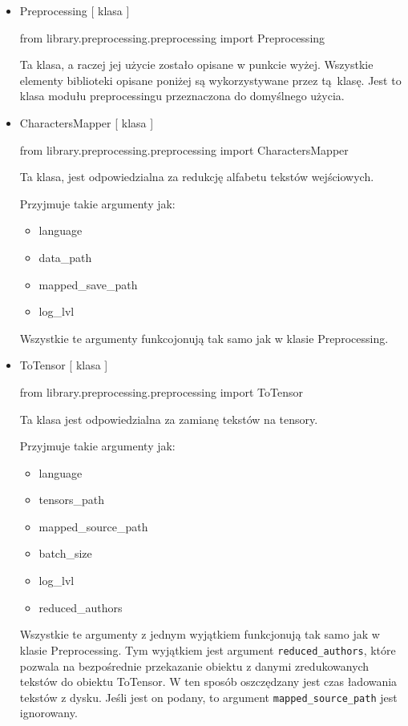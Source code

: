 \begin{itemize}
	
\item  {Preprocessing [ klasa ] }
\begin{import}
from library.preprocessing.preprocessing import Preprocessing
\end{import}

Ta klasa, a raczej jej użycie zostało opisane w punkcie wyżej. Wszystkie elementy biblioteki opisane
poniżej są wykorzystywane przez tą klasę. Jest to klasa modułu preprocessingu przeznaczona
do domyślnego użycia.

\item  {CharactersMapper [ klasa ] }
\begin{import}
from library.preprocessing.preprocessing import CharactersMapper
\end{import}
Ta klasa, jest odpowiedzialna za redukcję alfabetu tekstów wejściowych. 

Przyjmuje takie argumenty jak: 

\begin{itemize}
	\item language
	\item data\_path
	\item mapped\_save\_path
	\item log\_lvl
\end{itemize}

Wszystkie te argumenty funkcojonują tak samo jak w klasie Preprocessing.


\item  {ToTensor [ klasa ] }
\begin{import}
from library.preprocessing.preprocessing import ToTensor
\end{import}
Ta klasa jest odpowiedzialna za zamianę tekstów na tensory.

Przyjmuje takie argumenty jak: 

\begin{itemize}
	\item language
	\item tensors\_path
	\item mapped\_source\_path
	\item batch\_size
	\item log\_lvl
	\item reduced\_authors
\end{itemize}

Wszystkie te argumenty z jednym wyjątkiem funkcjonują tak samo jak w klasie Preprocessing. 
Tym wyjątkiem jest argument \texttt{reduced\_authors}, które pozwala na bezpośrednie przekazanie obiektu z danymi 
zredukowanych tekstów do obiektu ToTensor. W ten sposób oszczędzany jest czas ładowania tekstów z 
dysku. Jeśli jest on podany, to argument \texttt{mapped\_source\_path} jest ignorowany.

\end{itemize}

